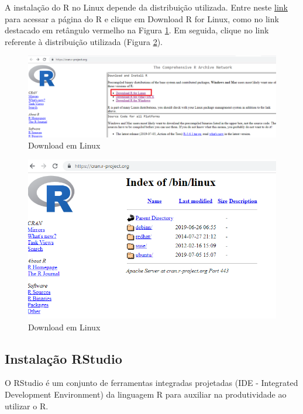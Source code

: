 \documentclass[
]{book}
\begin{document}
A instalação do R no Linux depende da distribuição utilizada. Entre neste \href{https://cran.r-project.org/}{link} para acessar a página do R e clique em Download R for Linux, como no link destacado em retângulo vermelho na Figura \ref{fig:linux1}. Em seguida, clique no link referente à distribuição utilizada (Figura \ref{fig:linux2}).

\begin{figure}
\includegraphics[width=1\linewidth]{figures/install_R_linux} \caption{\label{fig:linux1}Download em Linux}\label{fig:linux1}
\end{figure}

\begin{figure}
\includegraphics[width=1\linewidth]{figures/install_R_linux2} \caption{\label{fig:linux2}Download em Linux}\label{fig:linux2}
\end{figure}

\hypertarget{instalauxe7uxe3o-rstudio}{%
\subsection{Instalação RStudio}\label{instalauxe7uxe3o-rstudio}}

O RStudio é um conjunto de ferramentas integradas projetadas (IDE - Integrated Development Environment) da linguagem R para auxiliar na produtividade ao utilizar o R.
\end{document}
